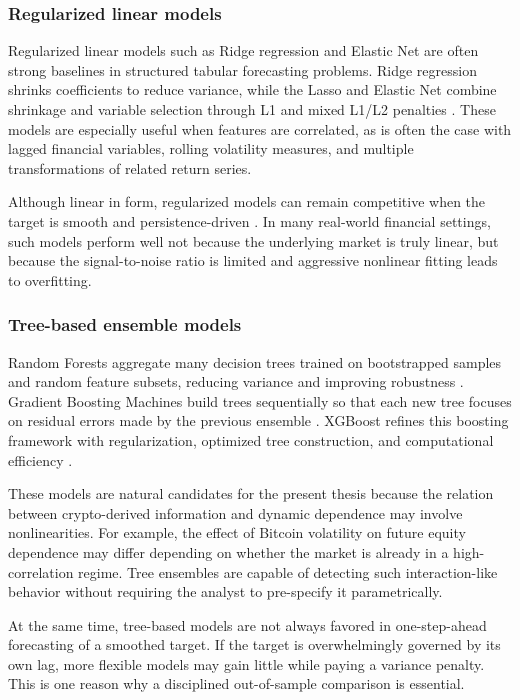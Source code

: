 \subsubsection{Regularized linear models}

Regularized linear models such as Ridge regression and Elastic Net are often strong baselines in structured tabular forecasting problems. Ridge regression shrinks coefficients to reduce variance, while the Lasso \cite{tibshirani1996} and Elastic Net combine shrinkage and variable selection through L1 and mixed L1/L2 penalties \cite{zou2005}. These models are especially useful when features are correlated, as is often the case with lagged financial variables, rolling volatility measures, and multiple transformations of related return series.

Although linear in form, regularized models can remain competitive when the target is smooth and persistence-driven \cite{lopezdeprado2018}. In many real-world financial settings, such models perform well not because the underlying market is truly linear, but because the signal-to-noise ratio is limited and aggressive nonlinear fitting leads to overfitting.

\subsubsection{Tree-based ensemble models}

Random Forests aggregate many decision trees trained on bootstrapped samples and random feature subsets, reducing variance and improving robustness \cite{breiman2001}. Gradient Boosting Machines build trees sequentially so that each new tree focuses on residual errors made by the previous ensemble \cite{friedman2001}. XGBoost refines this boosting framework with regularization, optimized tree construction, and computational efficiency \cite{chen2016}.

These models are natural candidates for the present thesis because the relation between crypto-derived information and dynamic dependence may involve nonlinearities. For example, the effect of Bitcoin volatility on future equity dependence may differ depending on whether the market is already in a high-correlation regime. Tree ensembles are capable of detecting such interaction-like behavior without requiring the analyst to pre-specify it parametrically.

At the same time, tree-based models are not always favored in one-step-ahead forecasting of a smoothed target. If the target is overwhelmingly governed by its own lag, more flexible models may gain little while paying a variance penalty. This is one reason why a disciplined out-of-sample comparison is essential.

